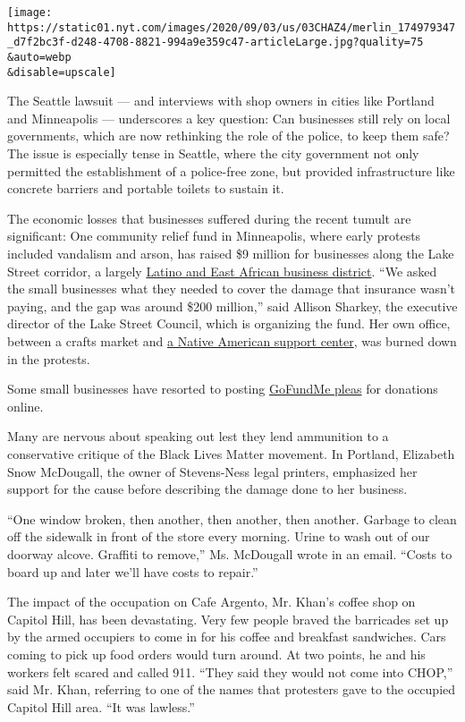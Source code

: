 \texttt{[image: https://static01.nyt.com/images/2020/09/03/us/03CHAZ4/merlin\_174979347\_d7f2bc3f-d248-4708-8821-994a9e359c47-articleLarge.jpg?quality=75\\\&auto=webp\\\&disable=upscale]}

The Seattle lawsuit --- and interviews with shop owners in cities like
Portland and Minneapolis --- underscores a key question: Can businesses
still rely on local governments, which are now rethinking the role of
the police, to keep them safe? The issue is especially tense in Seattle,
where the city government not only permitted the establishment of a
police-free zone, but provided infrastructure like concrete barriers and
portable toilets to sustain it.

The economic losses that businesses suffered during the recent tumult
are significant: One community relief fund in Minneapolis, where early
protests included vandalism and arson, has raised \$9 million for
businesses along the Lake Street corridor, a largely
\href{http://www2.minneapolismn.gov/ncr/engagement/WCMS1P-143470}{Latino
and East African business district}. ``We asked the small businesses
what they needed to cover the damage that insurance wasn't paying, and
the gap was around \$200 million,'' said Allison Sharkey, the executive
director of the Lake Street Council, which is organizing the fund. Her
own office, between a crafts market and \href{https://www.diw-mn.org/}{a
Native American support center}, was burned down in the protests.

Some small businesses have resorted to posting
\href{https://www.gofundme.com/f/1101-e-lake-street-minneapolis-mn}{GoFundMe
pleas} for donations online.

Many are nervous about speaking out lest they lend ammunition to a
conservative critique of the Black Lives Matter movement. In Portland,
Elizabeth Snow McDougall, the owner of Stevens-Ness legal printers,
emphasized her support for the cause before describing the damage done
to her business.

``One window broken, then another, then another, then another. Garbage
to clean off the sidewalk in front of the store every morning. Urine to
wash out of our doorway alcove. Graffiti to remove,'' Ms. McDougall
wrote in an email. ``Costs to board up and later we'll have costs to
repair.''

The impact of the occupation on Cafe Argento, Mr. Khan's coffee shop on
Capitol Hill, has been devastating. Very few people braved the
barricades set up by the armed occupiers to come in for his coffee and
breakfast sandwiches. Cars coming to pick up food orders would turn
around. At two points, he and his workers felt scared and called 911.
``They said they would not come into CHOP,'' said Mr. Khan, referring to
one of the names that protesters gave to the occupied Capitol Hill area.
``It was lawless.''

